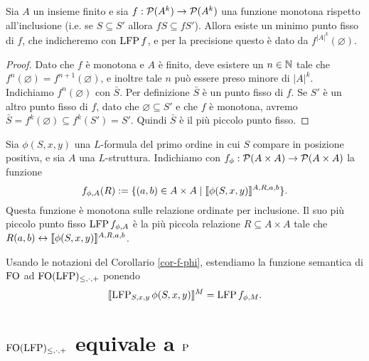 \begin{teorema}
\label{teo-tarski-knaster}
 Sia $A$ un insieme finito e sia $f: \powerset(A^k) \to \powerset(A^k)$ una
 funzione monotona rispetto all'inclusione
 (i.e. se $S \subseteq S'$ allora $f S \subseteq f S'$). Allora esiste un minimo
 punto fisso di $f$, che indicheremo con $\LFP f$, e per la precisione
 questo è dato da $f^{|A|^k}(\varnothing)$.
\end{teorema}

\begin{proof}
 Dato che $f$ è monotona e $A$ è finito, deve esistere un $n\in\N$ tale che
 $f^n(\varnothing) = f^{n+1}(\varnothing)$, e inoltre tale $n$ può essere preso
 minore di $|A|^k$. Indichiamo $f^n(\varnothing)$ con $\bar{S}$.
 Per definizione $\bar{S}$ è un punto fisso di $f$.
 Se $S'$ è un altro punto fisso di $f$, dato che $\varnothing \subseteq S'$ e
 che $f$ è monotona, avremo $\bar{S} = f^k(\varnothing) \subseteq f^k(S') = S'$.
 Quindi $\bar{S}$ è il più piccolo punto fisso.
\end{proof}

\begin{corollario}
\label{cor-f-phi}
 Sia $\phi(S,x,y)$ una $L$-formula del primo ordine in cui $S$ compare in posizione
 positiva, e sia $A$ una $L$-struttura.
 Indichiamo con $f_\phi: \powerset (A \times A) \to \powerset (A\times A)$ la funzione
 \[ f_{\phi,A}(R) := \{ (a,b) \in A \times A \mid \semantic{ \phi (S,x,y)}^{A,R,a,b} \}. \]
 Questa funzione è monotona sulle relazione ordinate per inclusione.
 Il suo più piccolo punto fisso $\LFP f_{\phi,A}$ è la più piccola relazione
 $R \subseteq A \times A$ tale che $R(a,b) \leftrightarrow \semantic{\phi(S,x,y)}^{A,R,a,b}$.
\end{corollario}

\begin{definizione}
 Usando le notazioni del Corollario \ref{cor-f-phi}, estendiamo la funzione
 semantica di $\FO$ ad $\FOLFP$ ponendo
 \[\semantic{\LFP_{S,x,y} \phi(S,x,y)}^M = \LFP f_{\phi,M}.\]
\end{definizione}

\section{\texorpdfstring{$\FOLFP$}{FO(LFP)} equivale a \texorpdfstring{$\P$}{P}}


